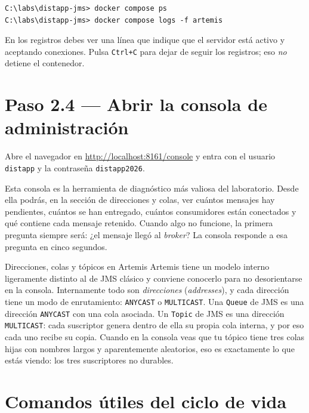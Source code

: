 \documentclass[11pt,a4paper]{book}
\newcommand{\clase}[1]{\texttt{#1}}
\begin{document}
\begin{lstlisting}[language=consola,caption={Comprobación del estado},label={lst:estado}]
C:\labs\distapp-jms> docker compose ps
C:\labs\distapp-jms> docker compose logs -f artemis
\end{lstlisting}

En los registros debes ver una línea que indique que el servidor está activo y aceptando conexiones.
Pulsa \texttt{Ctrl+C} para dejar de seguir los registros; eso \emph{no} detiene el contenedor.

\section{Paso 2.4 --- Abrir la consola de administración}

Abre el navegador en \url{http://localhost:8161/console} y entra con el usuario \texttt{distapp} y la contraseña \texttt{distapp2026}.

Esta consola es la herramienta de diagnóstico más valiosa del laboratorio.
Desde ella podrás, en la sección de direcciones y colas, ver cuántos mensajes hay pendientes, cuántos se han entregado, cuántos consumidores están conectados y qué contiene cada mensaje retenido.
Cuando algo no funcione, la primera pregunta siempre será: ¿el mensaje llegó al \emph{broker}?
La consola responde a esa pregunta en cinco segundos.

\begin{cajaNota}{Direcciones, colas y tópicos en Artemis}
	Artemis tiene un modelo interno ligeramente distinto al de JMS clásico y conviene conocerlo para no desorientarse en la consola.
	Internamente todo son \emph{direcciones} (\emph{addresses}), y cada dirección tiene un modo de enrutamiento: \texttt{ANYCAST} o \texttt{MULTICAST}.
	Una \clase{Queue} de JMS es una dirección \texttt{ANYCAST} con una cola asociada.
	Un \clase{Topic} de JMS es una dirección \texttt{MULTICAST}: cada suscriptor genera dentro de ella su propia cola interna, y por eso cada uno recibe su copia.
	Cuando en la consola veas que tu tópico tiene tres colas hijas con nombres largos y aparentemente aleatorios, eso es exactamente lo que estás viendo: los tres suscriptores no durables.
\end{cajaNota}

\section{Comandos útiles del ciclo de vida}
\end{document}
